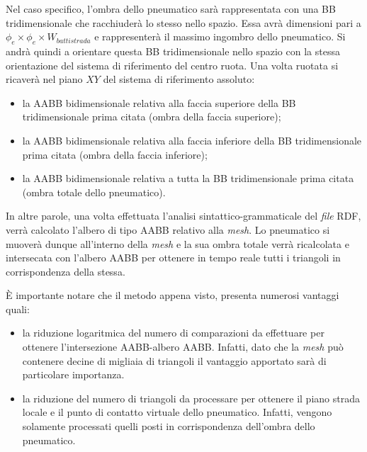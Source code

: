 Nel caso specifico, l'ombra dello pneumatico sarà rappresentata con una \ac{BB} tridimensionale che racchiuderà lo stesso nello spazio. Essa avrà dimensioni pari a $\phi_e \times \phi_e \times W_{battistrada}$ e rappresenterà il massimo ingombro dello pneumatico. Si andrà quindi a orientare questa \ac{BB} tridimensionale nello spazio con la stessa orientazione del sistema di riferimento del centro ruota. Una volta ruotata si ricaverà nel piano $XY$ del sistema di riferimento assoluto:
\begin{itemize}
	\item la \ac{AABB} bidimensionale relativa alla faccia superiore della \ac{BB} tridimensionale prima citata (ombra della faccia superiore);
	\item la \ac{AABB} bidimensionale relativa alla faccia inferiore della \ac{BB} tridimensionale prima citata (ombra della faccia inferiore);
	\item la \ac{AABB} bidimensionale relativa a tutta la \ac{BB} tridimensionale prima citata (ombra totale dello pneumatico).
\end{itemize}
In altre parole, una volta effettuata l'analisi sintattico-grammaticale del \textit{file} \ac{RDF}, verrà calcolato l'albero di tipo \ac{AABB} relativo alla \textit{mesh}. Lo pneumatico si muoverà dunque all'interno della \textit{mesh} e la sua ombra totale verrà ricalcolata  e intersecata con l'albero \ac{AABB} per ottenere in tempo reale tutti i triangoli in corrispondenza della stessa.

È importante notare che il metodo appena visto, presenta numerosi vantaggi quali:
\begin{itemize}
	\item la riduzione logaritmica del numero di comparazioni da effettuare per ottenere l'intersezione \ac{AABB}-albero \ac{AABB}. Infatti, dato che la \textit{mesh} può contenere decine di migliaia di triangoli il vantaggio apportato sarà di particolare importanza.
	\item la riduzione del numero di triangoli da processare per ottenere il piano strada locale e il punto di contatto virtuale dello pneumatico. Infatti, vengono solamente processati quelli posti in corrispondenza dell'ombra dello pneumatico.
\end{itemize}
%
